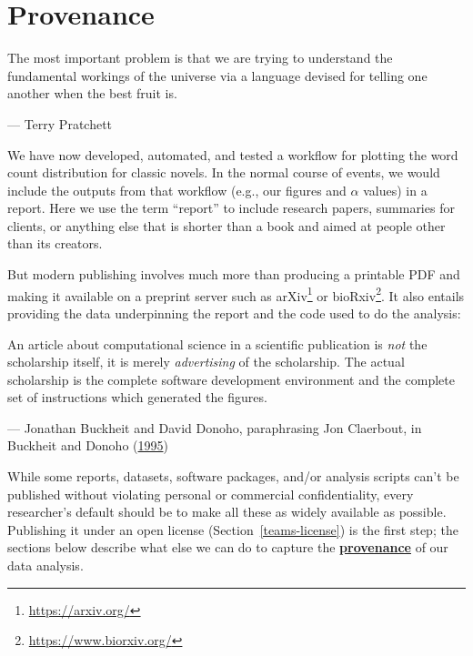 \documentclass[
]{krantz}
\renewenvironment{quote}{\begin{VF}}{\end{VF}}
\renewcommand{\href}[2]{#2\footnote{\url{#1}}}
\newcommand{\gref}[2]{\hyperlink{#2}{\textbf{#1}}}
\begin{document}
\hypertarget{provenance}{%
\chapter{Provenance}\label{provenance}}

\begin{quote}
The most important problem is that we are trying to understand the fundamental workings of the universe
via a language devised for telling one another when the best fruit is.

--- Terry Pratchett
\end{quote}

We have now developed, automated, and tested
a workflow for plotting the word count distribution for classic novels.
In the normal course of events,
we would include the outputs from that workflow (e.g., our figures and \(\alpha\) values)
in a report.
Here we use the term ``report'' to include research papers,
summaries for clients,
or anything else that is shorter than a book
and aimed at people other than its creators.

But modern publishing involves much more than producing a printable PDF
and making it available on a preprint server such as \href{https://arxiv.org/}{arXiv} or \href{https://www.biorxiv.org/}{bioRxiv}.
It also entails providing the data underpinning the report
and the code used to do the analysis:

\begin{quote}
An article about computational science in a scientific publication
is \emph{not} the scholarship itself,
it is merely \emph{advertising} of the scholarship.
The actual scholarship is the complete software development environment
and the complete set of instructions which generated the figures.

--- Jonathan Buckheit and David Donoho, paraphrasing Jon Claerbout, in Buckheit and Donoho (\protect\hyperlink{ref-Buck1995}{1995})
\end{quote}

While some reports, datasets, software packages, and/or analysis scripts
can't be published without violating personal or commercial confidentiality,
every researcher's default should be to make all these as widely available as possible.
Publishing it under an open license (Section~\ref{teams-license}) is the first step;
the sections below describe what else we can do to capture
the \gref{provenance}{provenance} of our data analysis.
\end{document}
